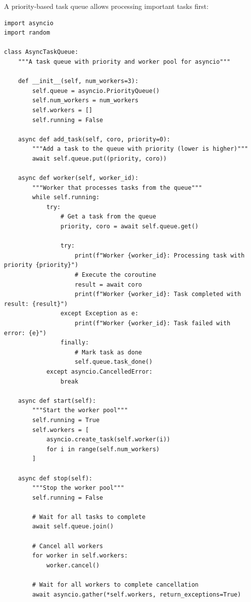 \documentclass[12pt,letterpaper]{article}
\newenvironment{macterminal}{%
    \begin{mdframed}[
        linecolor=terminalFrame,
        backgroundcolor=terminalBg,
        roundcorner=5pt,
        skipabove=10pt,
        skipbelow=10pt,
        linewidth=1pt,
        innertopmargin=10pt, %
        frametitle={%
            \tikz[baseline=(current bounding box.east), outer sep=0pt]{
                \fill[red!80!black] (0,0) circle (5pt);
                \fill[yellow!80!black] (0.7,0) circle (5pt);
                \fill[green!70!black] (1.4,0) circle (5pt);
            }
        },
        frametitlealignment=\raggedright, %
        frametitleaboveskip=8pt, %
        frametitlebelowskip=0pt, %
    ]
}{%
    \end{mdframed}%
}
\begin{document}
A priority-based task queue allows processing important tasks first:

\begin{macterminal}
\begin{lstlisting}
import asyncio
import random

class AsyncTaskQueue:
    """A task queue with priority and worker pool for asyncio"""
    
    def __init__(self, num_workers=3):
        self.queue = asyncio.PriorityQueue()
        self.num_workers = num_workers
        self.workers = []
        self.running = False
    
    async def add_task(self, coro, priority=0):
        """Add a task to the queue with priority (lower is higher)"""
        await self.queue.put((priority, coro))
    
    async def worker(self, worker_id):
        """Worker that processes tasks from the queue"""
        while self.running:
            try:
                # Get a task from the queue
                priority, coro = await self.queue.get()
                
                try:
                    print(f"Worker {worker_id}: Processing task with priority {priority}")
                    # Execute the coroutine
                    result = await coro
                    print(f"Worker {worker_id}: Task completed with result: {result}")
                except Exception as e:
                    print(f"Worker {worker_id}: Task failed with error: {e}")
                finally:
                    # Mark task as done
                    self.queue.task_done()
            except asyncio.CancelledError:
                break
    
    async def start(self):
        """Start the worker pool"""
        self.running = True
        self.workers = [
            asyncio.create_task(self.worker(i))
            for i in range(self.num_workers)
        ]
    
    async def stop(self):
        """Stop the worker pool"""
        self.running = False
        
        # Wait for all tasks to complete
        await self.queue.join()
        
        # Cancel all workers
        for worker in self.workers:
            worker.cancel()
        
        # Wait for all workers to complete cancellation
        await asyncio.gather(*self.workers, return_exceptions=True)


\end{lstlisting}
\end{macterminal}
\end{document}
